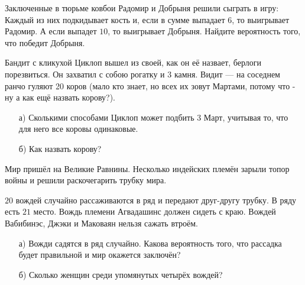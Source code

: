 \documentclass[12pt, a4paper, oneside]{article}
\begin{document}
\begin{problem}{5}
Заключенные в тюрьме ковбои Радомир и Добрыня решили сыграть в игру: Каждый из них подкидывает кость и, если в сумме выпадает $6$, то выигрывает Радомир. А если выпадет $10$, то выигрывает Добрыня. Найдите вероятность того, что победит Добрыня.
\end{problem}


\begin{problem}{5}
Бандит с кликухой Циклоп вышел из своей, как он её назвает, берлоги порезвиться. Он захватил с собою рогатку и 3 камня. Видит — на соседнем ранчо гуляют 20 коров (мало кто знает, но всех их зовут Мартами, потому что - ну а как ещё назвать корову?). 

\begin{enumerate}
    \item[а)] Сколькими способами Циклоп может подбить 3 Март, учитывая то, что для него все коровы одинаковые.
    \item[б)] Как назвать корову? 
\end{enumerate}
\end{problem}

\begin{problem}{10}
Мир пришёл на Великие Равнины. Несколько индейских племён зарыли топор войны и решили раскочегарить трубку мира. 

$20$ вождей случайно рассаживаются в ряд и передают друг-другу трубку. В ряду есть $21$ место. Вождь племени Агвадашинс должен сидеть с краю. Вождей Вабибинэс, Джэки и Маковаян нельзя сажать втроём. 

\begin{enumerate} 
    \item[а)] Вожди садятся в ряд случайно. Какова вероятность того, что рассадка будет правильной и мир окажется заключён? 
    \item[б)] Сколько женщин среди упомянутых четырёх вождей?
\end{enumerate}
\end{problem}
\end{document}
